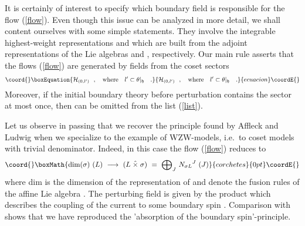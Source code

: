 \documentclass[a4paper,prd,twocolumn,nobibnotes,amssymb,preprintnumbers]{revtex4}
\begin{document}
It is certainly of interest to specify which boundary field is 
responsible for the flow (\ref{flow}). Even though this issue can 
be analyzed in more detail, we shall content ourselves with some 
simple statements. They involve the integrable highest-weight 
representations \myHighlight{$\theta$}\coordHE{} and \coordHE{} which are built from the 
adjoint representations of the Lie algebras \coordHE{} and \coordHE{}, 
respectively. Our main rule asserts that the flows (\ref{flow}) 
are generated by fields from the coset sectors 
\begin{equation}\coord{}\boxEquation{ \label{list}  
\mathcal{H} _{(0,l')}\ \ , \ \ \mbox{ where } \ \ 
   l' \subset \theta |_{\mathfrak{h}} \ \ \  .   
}{ \mathcal{H} _{(0,l')}\ \ , \ \ \mbox{ where } \ \ 
   l' \subset \theta |_{\mathfrak{h}} \ \ \  .   
}{ecuacion}\coordE{}\end{equation} 
Moreover, if the initial boundary theory before perturbation 
contains the sector \coordHE{} at most once, then 
\myHighlight{$l' = \theta'$}\coordHE{} can be omitted from the list (\ref{list}).   

Let us observe in passing that we recover the principle found by 
Affleck and Ludwig when we specialize to the example of WZW-models, 
i.e.\ to coset models with trivial denominator. Indeed, in this 
case the flow (\ref{flow}) reduces to
\[\coord{}\boxMath{
\text{dim} (\sigma)\ (L)\ \longrightarrow \ (L \; \hat{\times}\;  \sigma) 
\ = \ {\bigoplus}_{J}\  {N_{\sigma L}}^{J}
\ (J)
}{corchetes}{0pt}\coordE{}\]
where dim\myHighlight{$(\sigma)$}\coordHE{} is the dimension of the representation 
\myHighlight{$\sigma_0$}\coordHE{} of \coordHE{} and \coordHE{} denote the fusion rules of the 
affine Lie algebra \myHighlight{$\hat{\mathfrak{g}}$}\coordHE{}. The perturbing field is given 
by the product \myHighlight{$S^{\sigma } J(x)$}\coordHE{} which describes the coupling 
of the current \myHighlight{$J(x)$}\coordHE{} to some boundary spin \myHighlight{$S^\sigma$}\coordHE{}. Comparison 
with \cite{Affleck:1991by} shows that we have reproduced the 'absorption 
of the boundary spin'-principle. 
\medskip 
\end{document}
